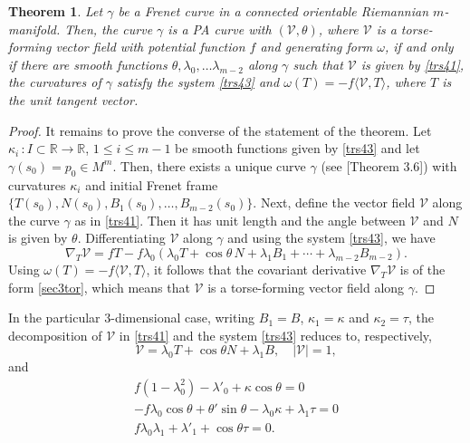 \documentclass[12pt]{amsart}
\def\r{\mathbb R}
\def\v{\mathcal V}
\newtheorem{theorem}{Theorem}[section]
\theoremstyle{definition}
\begin{document}
\begin{theorem}\label{prop41}
Let $\gamma $ be a Frenet curve in a connected orientable Riemannian $m$-manifold. Then, the curve $\gamma$ is a PA curve with $(\v,\theta)$, where $\v$ is a torse-forming vector field with potential function $f$ and generating form $\omega$, if and only if there are smooth functions $\theta,\lambda_0,\ldots\lambda_{m-2}$ along $\gamma$ such that $\v$ is given by \eqref{trs41}, the curvatures of $\gamma$ satisfy the system \eqref{trs43} and $\omega(T)=-f\langle \v,T\rangle$, where $T$ is the unit tangent vector.
\end{theorem}
\begin{proof}
It remains to prove the converse of the statement of the theorem. Let $\kappa_i\,:I\subset \r \to \r$, $1\leq i \leq m-1$ be smooth functions given by \eqref{trs43} and let $\gamma(s_0)=p_0\in M^m$. Then, there exists a unique curve $\gamma$ (see [Theorem 3.6]\cite{lmm})
with curvatures $\kappa_i$ and initial Frenet frame $\{T(s_0),N(s_0),B_1(s_0),\ldots,B_{m-2}(s_0)\}$. Next, define the vector field $\v$ along the curve $\gamma$ as in \eqref{trs41}. Then it has unit length and the angle between $\v$ and $N$ is given by $\theta$. Differentiating $\v$ along $\gamma$ and using the system \eqref{trs43}, we have
$$
\nabla_T\v = fT - f\lambda_0(\lambda_0T+\cos \theta\, N+\lambda_1B_1+\cdots+\lambda_{m-2}B_{m-2}).
$$
Using $\omega(T)=-f\langle \v,T\rangle$, it follows that the covariant derivative $\nabla_T\v $ is of the form \eqref{sec3tor}, which means that $\v$ is a torse-forming vector field along $\gamma$.
\end{proof}


In the particular $3$-dimensional case, writing $B_1=B$, $\kappa_1=\kappa$ and $\kappa_2=\tau$, the decomposition of $\v$ in \eqref{trs41} and the system \eqref{trs43} reduces to, respectively,
\begin{equation}
\v=\lambda_0T+\cos \theta N+\lambda_1 B, \quad |\v |=1, \label{trs44}
\end{equation}
and
\begin{equation}
\left. 
\begin{array}{r}
f(1-\lambda_0^2)-\lambda'_0+ \kappa\cos\theta=0 \\ [4pt]
-f\lambda_0\cos\theta+\theta'\sin \theta-\lambda_0\kappa+\lambda_1\tau=0 \\ [4pt]
f\lambda_0\lambda_{1}+\lambda'_{1}+\cos\theta\tau=0.
\end{array}%
\right. \label{trs45}
\end{equation}
\end{document}

